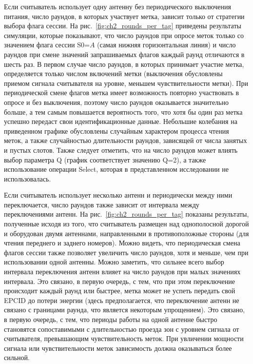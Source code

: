 Если считыватель использует одну антенну без периодического выключения питания, число раундов, в которых участвует метка, зависит только от стратегии выбора флага сессии. На рис.~\ref{fig:ch2_rounds_per_tag} приведены результаты симуляции, которые показывают, что число раундов при опросе меток только со значением флага сессии S0=$A$ (самая нижняя горизонтальная линия) и число раундов при смене значений запрашиваемых флагов каждый раунд отличаются в шесть раз. В первом случае число раундов, в которых принимает участие метка, определяется только числом включений метки (выключения обусловлены приемом сигнала считывателя на уровне, меньшем чувствительности метки). При периодической смене флагов метка имеет возможность повторно участвовать в опросе и без выключения, поэтому число раундов оказывается значительно больше, а тем самым повышается вероятность того, что хотя бы один раз метка успешно передаст свои идентификационные данные. Небольшие колебания на приведенном графике обусловлены случайным характером процесса чтения меток, а также случайностью длительности раундов, зависящей от числа занятых и пустых слотов. Также следует отметить, что на число раундов может влиять выбор параметра Q (график соответствует значению Q=2), а также использование операции Select, которая в представленном исследовании не использовалась.

Если считыватель использует несколько антенн и периодически между ними переключается, число раундов также зависит от интервала между переключениями антенн. На рис.~\ref{fig:ch2_rounds_per_tag} показаны результаты, полученные исходя из того, что считыватель размещен над однополосной дорогой и оборудован двумя антеннами, направленными в противоположные стороны (для чтения переднего и заднего номеров). Можно видеть, что периодическая смена флагов сессии также позволяет увеличить число раундов, хотя и меньше, чем при использовании одной антенны. Можно заметить, что сильнее всего выбор интервала переключения антенн влияет на число раундов при малых значениях интервала. Это связано, в первую очередь, с тем, что при этом переключение происходит каждый раунд или быстрее, метка может не успеть передать свой EPCID до потери энергии (здесь предполагается, что переключение антенн не связано с границами раунда, что является некоторым упрощением). Это связано, в первую очередь, с тем, что периоды работы на одной антенне быстро становятся сопоставимыми с длительностью проезда зон с уровнем сигнала от считывателя, превышающим чувствительность меток. При увличении мощности сигнала или чувствительности меток зависимость должна оказываться более сильной.

